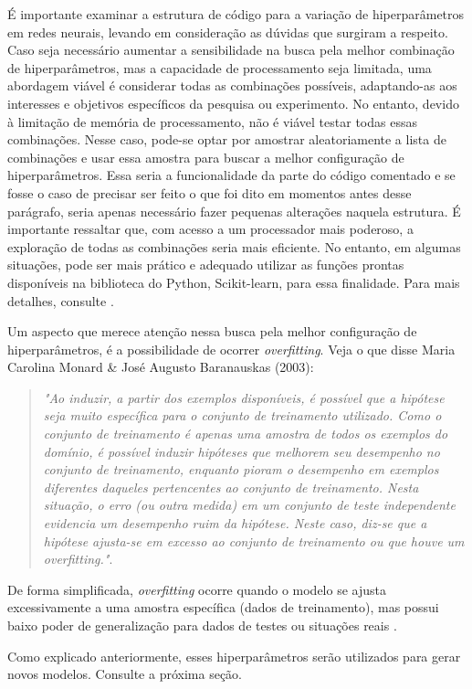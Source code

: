 \documentclass[a4paper,12pt]{article} %
\begin{document}
É importante examinar a estrutura de código para a variação de hiperparâmetros em redes neurais, levando em consideração as dúvidas que surgiram a respeito. Caso seja necessário aumentar a sensibilidade na busca pela melhor combinação de hiperparâmetros, mas a capacidade de processamento seja limitada, uma abordagem viável é considerar todas as combinações possíveis, adaptando-as aos interesses e objetivos específicos da pesquisa ou experimento. No entanto, devido à limitação de memória de processamento, não é viável testar todas essas combinações. Nesse caso, pode-se optar por amostrar aleatoriamente a lista de combinações e usar essa amostra para buscar a melhor configuração de hiperparâmetros. Essa seria a funcionalidade da parte do código comentado e se fosse o caso de precisar ser feito o que foi dito em momentos antes desse parágrafo, seria apenas necessário fazer pequenas alterações naquela estrutura. É importante ressaltar que, com acesso a um processador mais poderoso, a exploração de todas as combinações seria mais eficiente. No entanto, em algumas situações, pode ser mais prático e adequado utilizar as funções prontas disponíveis na biblioteca do Python, Scikit-learn, para essa finalidade. Para mais detalhes, consulte \cite{sklearn}.

Um aspecto que merece atenção nessa busca pela  melhor configuração de hiperparâmetros, é a possibilidade de ocorrer \textit{overfitting}. Veja o que disse Maria Carolina Monard \& José Augusto Baranauskas (2003):
\begin{quote}
    \textit{"Ao induzir, a partir dos exemplos disponíveis, é possível que a hipótese seja muito específica para o conjunto de treinamento utilizado. Como o conjunto de treinamento é apenas uma amostra de todos os exemplos do domínio, é possível induzir hipóteses que melhorem seu desempenho no conjunto de treinamento, enquanto pioram o desempenho em exemplos diferentes daqueles pertencentes ao conjunto de treinamento. Nesta situação, o erro (ou outra medida) em um conjunto de teste independente evidencia um desempenho ruim da hipótese. Neste caso, diz-se que a hipótese ajusta-se em excesso ao conjunto de treinamento ou que houve um overfitting."}.
\end{quote}
De forma simplificada, \textit{overfitting} ocorre quando o modelo se ajusta excessivamente a uma amostra específica (dados de treinamento), mas possui baixo poder de generalização para dados de testes ou situações reais \cite{izbicki2020aprendizado}.

Como explicado anteriormente, esses hiperparâmetros serão utilizados para gerar novos modelos. Consulte a próxima seção.
\end{document}
